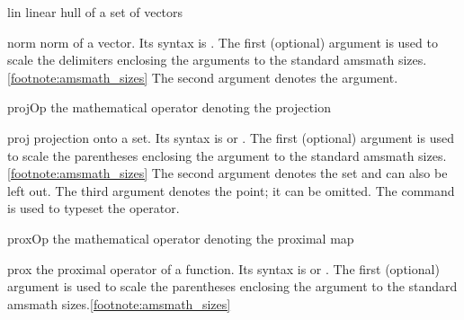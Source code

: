 \documentclass[english,a4paper,DIV=12,parskip=full,oneside]{scrartcl}
\begin{document}
\begin{commandlist}
        \item[lin] linear hull of a set of vectors 
        \item[norm] norm of a vector.
            Its syntax is .
            The first (optional) argument is used to scale the delimiters enclosing the arguments to the standard amsmath sizes.\cref{footnote:amsmath_sizes}
            The second argument denotes the argument.
            \par{}
            \par{}
            \par{}
        \item[projOp] the mathematical operator denoting the projection \mathCodeExample{\projOp}
            \par\mathCodeExample{\projOp}
        \item[proj] projection onto a set.
            Its syntax is  or .
            The first (optional) argument is used to scale the parentheses enclosing the argument to the standard amsmath sizes.\cref{footnote:amsmath_sizes}
            The second argument denotes the set and can also be left out.
            The third argument denotes the point; it can be omitted.
            The command \codeCommand{\projOp} is used to typeset the operator.
            \par\mathCodeExample{\proj}
            \par{}
            \par\mathCodeExample{\proj{\cC}}
            \par{}
            \par{}
            \par{}
        \item[proxOp] the mathematical operator denoting the proximal map
            \par\mathCodeExample{\proxOp}
        \item[prox] the proximal operator of a function.
            Its syntax is  or .
            The first (optional) argument is used to scale the parentheses enclosing the argument to the standard amsmath sizes.\cref{footnote:amsmath_sizes}

\end{commandlist}
\end{document}
